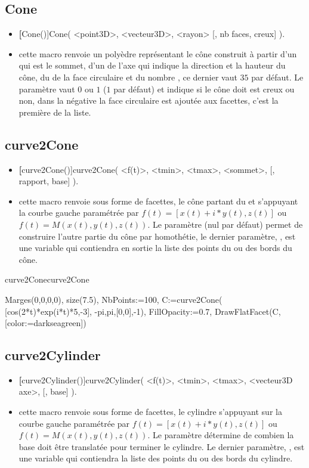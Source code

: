 \subsection{Cone}
\begin{itemize}
 \item \textbf[Cone()]{Cone( <point3D>, <vecteur3D>, <rayon> [, nb faces, creux] )}.
 \item \desc cette macro renvoie un polyèdre représentant le cône construit à partir d'un  qui est le sommet, d'un  de l'axe qui indique la direction et la hauteur du cône, du  de la face circulaire et du nombre , ce dernier vaut $35$ par défaut. Le paramètre  vaut $0$ ou $1$ ($1$ par défaut) et indique si le cône doit est creux ou non, dans la négative la face circulaire est ajoutée aux facettes, c'est la première de la liste.
\end{itemize}


\subsection{curve2Cone}
\begin{itemize}
 \item \util \textbf[curve2Cone()]{curve2Cone( <f(t)>, <tmin>, <tmax>, <sommet>, [, rapport, base] )}.
 \item \desc cette macro renvoie sous forme de facettes, le cône partant du  et s'appuyant la courbe gauche paramétrée par $f(t)=[x(t)+i*y(t), z(t)]$ ou $f(t)=M(x(t),y(t),z(t))$. Le paramètre  (nul par défaut) permet de construire l'autre partie du cône par homothétie, le dernier paramètre, , est une variable qui contiendra en sortie la liste des points du ou des bords du cône.
\end{itemize}


\begin{demo}{curve2Cone}{curve2Cone}
\begin{texgraph}[name=curve2Cone]
Marges(0,0,0,0), size(7.5), NbPoints:=100,
C:=curve2Cone( [cos(2*t)*exp(i*t)*5,-3],
        -pi,pi,[0,0],-1),
FillOpacity:=0.7,
DrawFlatFacet(C,[color:=darkseagreen])
\end{texgraph}
\end{demo}


\subsection{curve2Cylinder}
\begin{itemize}
 \item \util \textbf[curve2Cylinder()]{curve2Cylinder( <f(t)>, <tmin>, <tmax>, <vecteur3D axe>, [, base] )}.
 \item \desc cette macro renvoie sous forme de facettes, le cylindre s'appuyant sur la courbe gauche paramétrée par $f(t)=[x(t)+i*y(t), z(t)]$ ou $f(t)=M(x(t),y(t),z(t))$. Le paramètre  détermine de combien la base doit être translatée pour terminer le cylindre. Le dernier paramètre, , est une variable qui contiendra la liste des points du ou des bords du cylindre.
\end{itemize}

